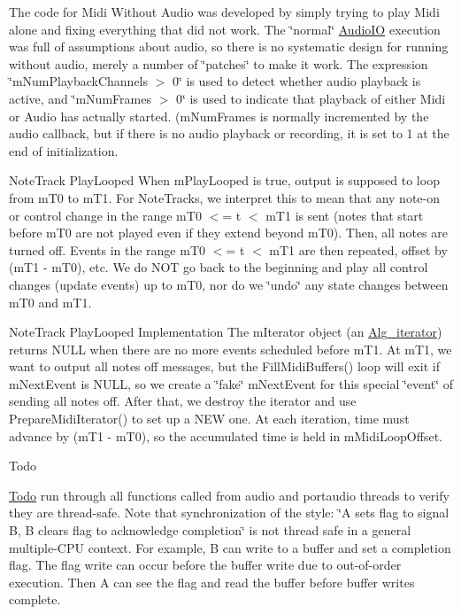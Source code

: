 \begin{DoxyParagraph}{The code for Midi Without Audio was developed by simply trying}
to play Midi alone and fixing everything that did not work. The \char`\"{}normal\char`\"{} \hyperlink{class_audio_i_o}{Audio\+IO} execution was full of assumptions about audio, so there is no systematic design for running without audio, merely a number of \char`\"{}patches\char`\"{} to make it work. The expression \char`\"{}m\+Num\+Playback\+Channels $>$ 0\char`\"{} is used to detect whether audio playback is active, and \char`\"{}m\+Num\+Frames $>$ 0\char`\"{} is used to indicate that playback of either Midi or Audio has actually started. (m\+Num\+Frames is normally incremented by the audio callback, but if there is no audio playback or recording, it is set to 1 at the end of initialization.
\end{DoxyParagraph}
\begin{DoxyParagraph}{Note\+Track Play\+Looped}
When m\+Play\+Looped is true, output is supposed to loop from m\+T0 to m\+T1. For Note\+Tracks, we interpret this to mean that any note-\/on or control change in the range m\+T0 $<$= t $<$ m\+T1 is sent (notes that start before m\+T0 are not played even if they extend beyond m\+T0). Then, all notes are turned off. Events in the range m\+T0 $<$= t $<$ m\+T1 are then repeated, offset by (m\+T1 -\/ m\+T0), etc. We do N\+OT go back to the beginning and play all control changes (update events) up to m\+T0, nor do we \char`\"{}undo\char`\"{} any state changes between m\+T0 and m\+T1.
\end{DoxyParagraph}
\begin{DoxyParagraph}{Note\+Track Play\+Looped Implementation}
The m\+Iterator object (an \hyperlink{class_alg__iterator}{Alg\+\_\+iterator}) returns N\+U\+LL when there are no more events scheduled before m\+T1. At m\+T1, we want to output all notes off messages, but the Fill\+Midi\+Buffers() loop will exit if m\+Next\+Event is N\+U\+LL, so we create a \char`\"{}fake\char`\"{} m\+Next\+Event for this special \char`\"{}event\char`\"{} of sending all notes off. After that, we destroy the iterator and use Prepare\+Midi\+Iterator() to set up a N\+EW one. At each iteration, time must advance by (m\+T1 -\/ m\+T0), so the accumulated time is held in m\+Midi\+Loop\+Offset.
\end{DoxyParagraph}
\begin{DoxyRefDesc}{Todo}
\item[\hyperlink{todo__todo000043}{Todo}]run through all functions called from audio and portaudio threads to verify they are thread-\/safe. Note that synchronization of the style\+: \char`\"{}\+A sets flag to signal B, B clears flag to acknowledge completion\char`\"{} is not thread safe in a general multiple-\/\+C\+PU context. For example, B can write to a buffer and set a completion flag. The flag write can occur before the buffer write due to out-\/of-\/order execution. Then A can see the flag and read the buffer before buffer writes complete.\end{DoxyRefDesc}


